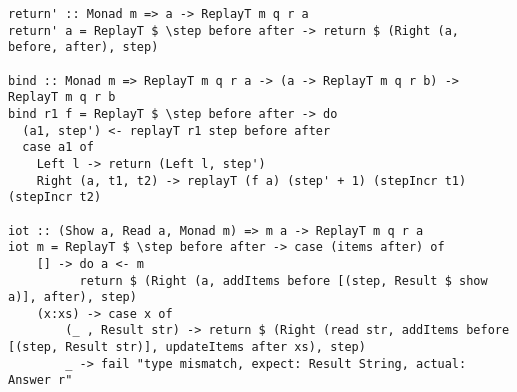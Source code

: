 \documentclass[10pt]{article}
\begin{document}
\begin{itemize}
\begin{lstlisting}
return' :: Monad m => a -> ReplayT m q r a                                                                                                                                                    
return' a = ReplayT $ \step before after -> return $ (Right (a, before, after), step) 

bind :: Monad m => ReplayT m q r a -> (a -> ReplayT m q r b) -> ReplayT m q r b                                                                                                               
bind r1 f = ReplayT $ \step before after -> do                                                                                                                                                
  (a1, step') <- replayT r1 step before after                                                                                                                                                 
  case a1 of                                                                                                                                                                                  
    Left l -> return (Left l, step')                                                                                                                                                          
    Right (a, t1, t2) -> replayT (f a) (step' + 1) (stepIncr t1) (stepIncr t2)
    
iot :: (Show a, Read a, Monad m) => m a -> ReplayT m q r a                                                                                                                                    
iot m = ReplayT $ \step before after -> case (items after) of                                                                                                                                 
    [] -> do a <- m                                                                                                                                                                           
          return $ (Right (a, addItems before [(step, Result $ show a)], after), step)                                                                                                        
    (x:xs) -> case x of                                                                                                                                                                       
        (_ , Result str) -> return $ (Right (read str, addItems before [(step, Result str)], updateItems after xs), step)                                                                     
        _ -> fail "type mismatch, expect: Result String, actual: Answer r"                                             


\end{lstlisting}
\end{itemize}
\end{document}

